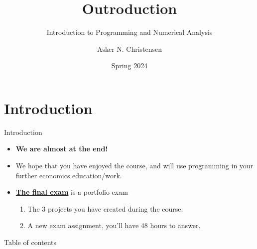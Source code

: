 \documentclass[10pt,english,t,aspectratio=169]{beamer}
\title{Outroduction\vspace{-2mm}}
\subtitle{Introduction to Programming and Numerical Analysis \vspace{-4mm} }
\author{Asker N. Christensen}
\date{Spring 2024}
\makeatletter
\let\origtableofcontents=\tableofcontents
\def\tableofcontents{\@ifnextchar[{\origtableofcontents}{\gobbletableofcontents}}
\def\gobbletableofcontents#1{\origtableofcontents}
\makeatother
\begin{document}
{
\begin{frame}

\maketitle

\end{frame}
}
\addtocounter{framenumber}{-1}



\section{Introduction}
\begin{frame}{Introduction}
    \begin{itemize}
        \item \textbf{We are almost at the end!}
        \item We hope that you have enjoyed the course, and will use programming in your further economics education/work.
        \item \textbf{\href{https://github.com/NumEconCopenhagen/IntroProg-lectures/blob/main/projects/ExamProject.pdf}{The final exam}} is a portfolio exam 
        \begin{enumerate}[-]
            \item The 3 projects you have created during the course.
            \item A new exam assignment, you'll have 48 hours to answer.
        \end{enumerate}
        
    \end{itemize}
\end{frame}

\begin{frame}{Table of contents}
    \tableofcontents[]
\end{frame}
\end{document}
